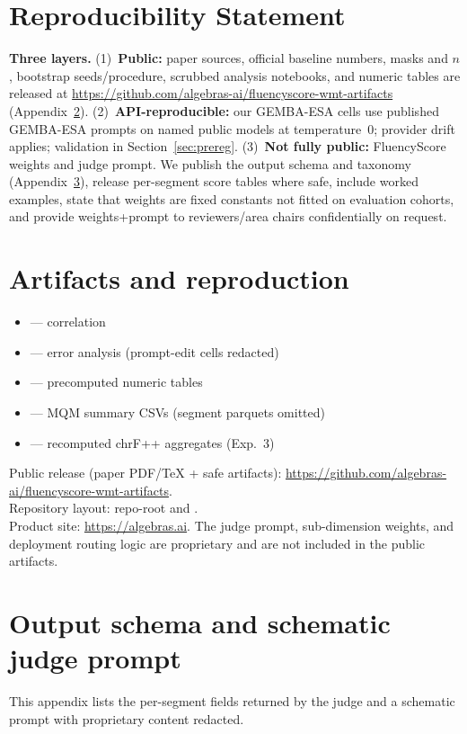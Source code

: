 \documentclass[11pt]{article}
\newcommand{\FS}{FluencyScore}
\newcommand{\ArtifactsLink}{\url{https://github.com/algebras-ai/fluencyscore-wmt-artifacts}}
\begin{document}
\section{Reproducibility Statement}
\label{sec:repro}
\textbf{Three layers.}
(1)~\textbf{Public:} paper sources, official baseline numbers, masks and $n$,
bootstrap seeds/procedure, scrubbed analysis notebooks, and numeric tables are
released at \ArtifactsLink{} (Appendix~\ref{app:artifacts}).
(2)~\textbf{API-reproducible:} our GEMBA-ESA cells use published GEMBA-ESA prompts
on named public models at temperature~0; provider drift applies; validation in
Section~\ref{sec:prereg}.
(3)~\textbf{Not fully public:} \FS{} weights and judge prompt.
We publish the output schema and taxonomy (Appendix~\ref{app:schema}), release
per-segment score tables where safe, include worked examples, state that weights
are fixed constants not fitted on evaluation cohorts, and provide weights+prompt
to reviewers/area chairs confidentially on request.

\appendix
\section{Artifacts and reproduction}
\label{app:artifacts}
\begin{itemize}
\item {} --- correlation
\item {} --- error analysis
  (prompt-edit cells redacted)
\item {} --- precomputed numeric tables
\item {} --- MQM summary CSVs (segment parquets omitted)
\item {}
  --- recomputed chrF++ aggregates (Exp.~3)
\end{itemize}
Public release (paper PDF/\TeX{} + safe artifacts): \ArtifactsLink.\\
Repository layout: repo-root  and .\\
Product site: \url{https://algebras.ai}.
The judge prompt, sub-dimension weights, and deployment routing logic are
proprietary and are not included in the public artifacts.

\section{Output schema and schematic judge prompt}
\label{app:schema}
This appendix lists the per-segment fields returned by the judge and a schematic prompt with proprietary content redacted.
\end{document}

